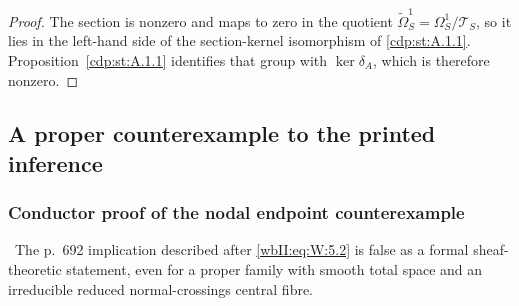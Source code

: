 \begin{proof}
The section is nonzero and maps to zero in the quotient
$\widetilde\Omega^1_S=\Omega^1_S/\mathscr T_S$, so it
lies in the left-hand side of the section-kernel isomorphism of \cref{cdp:st:A.1.1}.  Proposition~\ref{cdp:st:A.1.1}
identifies that group with $\ker\delta_A$, which is therefore nonzero.
\end{proof}

\subsection{A proper counterexample to the printed inference}

\subsubsection*{Conductor proof of the nodal endpoint counterexample}

\ The p.~692 implication described after \eqref{wbII:eq:W:5.2} is false as a formal
sheaf-theoretic statement, even for a proper family with smooth total space
and an irreducible reduced normal-crossings central fibre.



